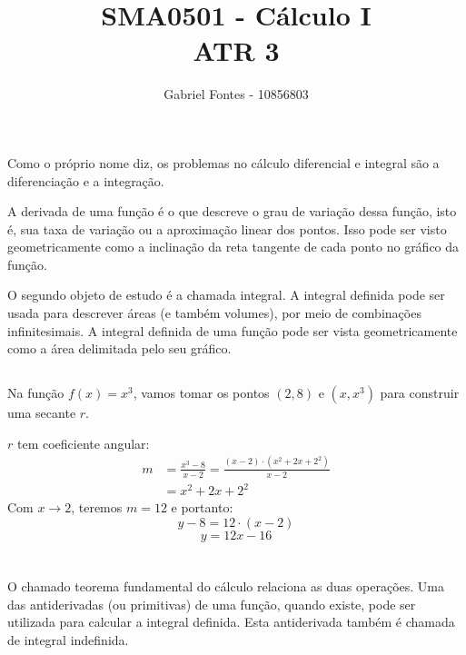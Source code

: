 \documentclass[12pt]{article}
\title{SMA0501 - Cálculo I \\ ATR 3}%
\author{Gabriel Fontes - 10856803}%
\begin{document}
\maketitle

\section{}
\subsection{}
Como o próprio nome diz, os problemas no cálculo diferencial e integral são a diferenciação e a integração.

A derivada de uma função é o que descreve o grau de variação dessa função, isto é, sua taxa de variação ou a aproximação linear dos pontos. Isso pode ser visto geometricamente como a inclinação da reta tangente de cada ponto no gráfico da função.

O segundo objeto de estudo é a chamada integral. A integral definida pode ser usada para descrever áreas (e também volumes), por meio de combinações infinitesimais. A integral definida de uma função pode ser vista geometricamente como a área delimitada pelo seu gráfico.
\subsection{}
Na função \(f(x) = x^3\), vamos tomar os pontos \((2,8)\) e \((x,x^3)\) para construir uma secante \(r\).

\(r\) tem coeficiente angular:
\begin{align*}
	m &= \frac{x^3-8}{x-2} = \frac{(x-2)\cdot(x^2 + 2x + 2^2)}{x-2} \\
	  &= x^2 + 2x + 2^2
\end{align*}
Com \(x\rightarrow2\), teremos \(m = 12\) e portanto:
\[
	y - 8 = 12\cdot(x-2)
\]
\[
	\boxed{
		y = 12x - 16
	}
\]
\section{}
\subsection{}
O chamado teorema fundamental do cálculo relaciona as duas operações. Uma das antiderivadas (ou primitivas) de uma função, quando existe, pode ser utilizada para calcular a integral definida. Esta antiderivada também é chamada de integral indefinida.
\end{document}
